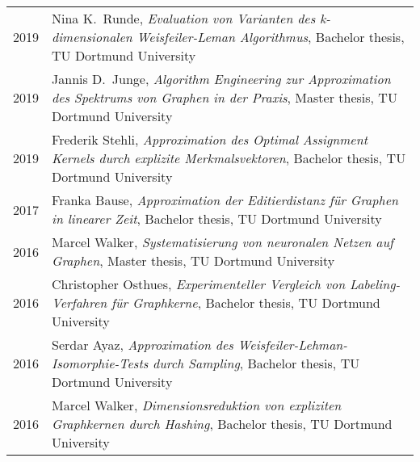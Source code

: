 \documentclass[10pt, a4paper, DIV=14, headings=small]{scrartcl}
\begin{document}
\begin{longtabu}{p{2.1cm}p{12.0cm}}
	2019 & Nina K.\ Runde, \emph{Evaluation von Varianten des k-dimensionalen Weisfeiler-Leman Algorithmus}, Bachelor thesis, TU Dortmund University                                                            \\
	2019 & Jannis D.\ Junge, \emph{Algorithm Engineering zur Approximation des Spektrums von Graphen in der Praxis}, Master thesis, TU Dortmund University                                                      \\
	2019 & Frederik Stehli, \emph{Approximation des Optimal Assignment Kernels durch explizite Merkmalsvektoren}, Bachelor thesis, TU Dortmund University                                                       \\
	2017 & Franka Bause, \emph{Approximation der Editierdistanz für Graphen in linearer Zeit}, Bachelor thesis, TU Dortmund University                                                                          \\
	2016 & Marcel Walker, \emph{Systematisierung von neuronalen Netzen auf Graphen}, Master thesis, TU Dortmund University                                                                                      \\
	2016 & Christopher Osthues, \emph{Experimenteller Vergleich von Labeling-Verfahren für Graphkerne}, Bachelor thesis, TU Dortmund University                                                                 \\
	2016 & Serdar Ayaz, \emph{Approximation des Weisfeiler-Lehman-Isomorphie-Tests durch Sampling}, Bachelor thesis, TU Dortmund University                                                                     \\
	2016 & Marcel Walker, \emph{Dimensionsreduktion von expliziten Graphkernen durch Hashing}, Bachelor thesis, TU Dortmund University                                                                          \\
\end{longtabu}
\end{document}
